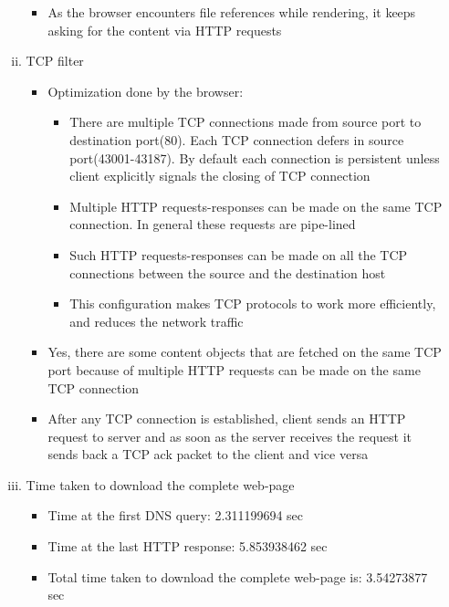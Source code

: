 \documentclass{article}
\begin{document}
\begin{enumerate}[a)]
\begin{enumerate}[i)]
\begin{itemize}
                        \item As the browser encounters file references while rendering, it keeps asking for the content via HTTP requests
                    \end{itemize}{}
                \item TCP filter
                    \begin{itemize}
                        \item Optimization done by the browser:
                        \begin{itemize}
                            \item There are multiple TCP connections made from source port to destination port(80). Each TCP connection defers in source port(43001-43187). By default each connection is persistent unless client explicitly signals the closing of TCP connection \item Multiple HTTP requests-responses can be made on the same TCP connection. In general these requests are pipe-lined
                            \item Such HTTP requests-responses can be made on all the TCP connections between the source and the destination host
                            \item This configuration makes TCP protocols to work more efficiently, and reduces the network traffic
                        \end{itemize}{}
                        \item Yes, there are some content objects that are fetched on the same TCP port because of multiple HTTP requests can be made on the same TCP connection
                        \item After any TCP connection is established, client sends an HTTP request to server and as soon as the server receives the request it sends back a TCP ack packet to the client and vice versa
                    \end{itemize}{}
                \item Time taken to download the complete web-page
                    \begin{itemize}
                        \item Time at the first DNS query: 2.311199694 sec
                        \item Time at the last HTTP response: 5.853938462 sec
                        \item Total time taken to download the complete web-page is: 3.54273877 sec

\end{itemize}
\end{enumerate}
\end{enumerate}
\end{document}
